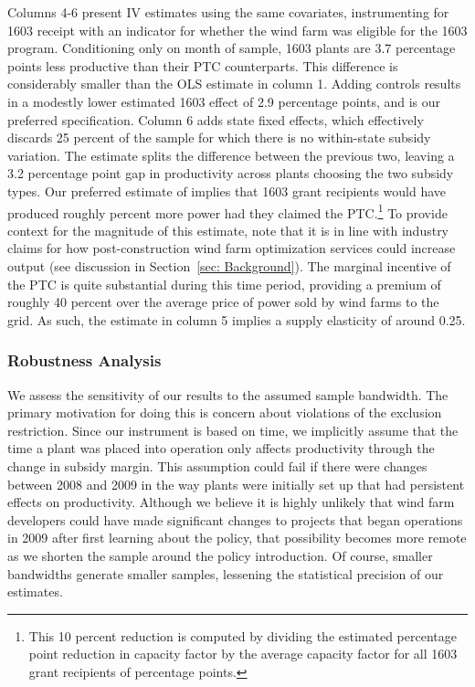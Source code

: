\documentclass[12pt]{article}
\begin{document}
Columns 4-6 present IV estimates using the same covariates, instrumenting for 1603 receipt with an indicator for whether the wind farm was eligible for the 1603 program. Conditioning only on month of sample, 1603 plants are 3.7 percentage points less productive than their PTC counterparts. This difference is considerably smaller than the OLS estimate in column 1. Adding controls results in a modestly lower estimated 1603 effect of 2.9 percentage points, and is our preferred specification. Column 6 adds state fixed effects, which effectively discards 25 percent of the sample for which there is no within-state subsidy variation. The estimate splits the difference between the previous two, leaving a 3.2 percentage point gap in productivity across plants choosing the two subsidy types. Our preferred estimate of implies that 1603 grant recipients would have produced roughly percent more power had they claimed the PTC.\footnote{This 10 percent reduction is computed by dividing the estimated percentage point reduction in capacity factor by the average capacity factor for all 1603 grant recipients of percentage points.} To provide context for the magnitude of this estimate, note that it is in line with industry claims for how post-construction wind farm optimization services could increase output (see discussion in Section~\ref{sec: Background}). The marginal incentive of the PTC is quite substantial during this time period, providing a premium of roughly 40 percent over the average price of power sold by wind farms to the grid. As such, the estimate in column 5 implies a supply elasticity of around 0.25. 

\subsubsection*{Robustness Analysis}

We assess the sensitivity of our results to the assumed sample bandwidth. The primary motivation for doing this is concern about violations of the exclusion restriction. Since our instrument is based on time, we implicitly assume that the time a plant was placed into operation only affects productivity through the change in subsidy margin. This assumption could fail if there were changes between 2008 and 2009 in the way plants were initially set up that had persistent effects on productivity. Although we believe it is highly unlikely that wind farm developers could have made significant changes to projects that began operations in 2009 after first learning about the policy, that possibility becomes more remote as we shorten the sample around the policy introduction. Of course, smaller bandwidths generate smaller samples, lessening the statistical precision of our estimates. 
\end{document}

